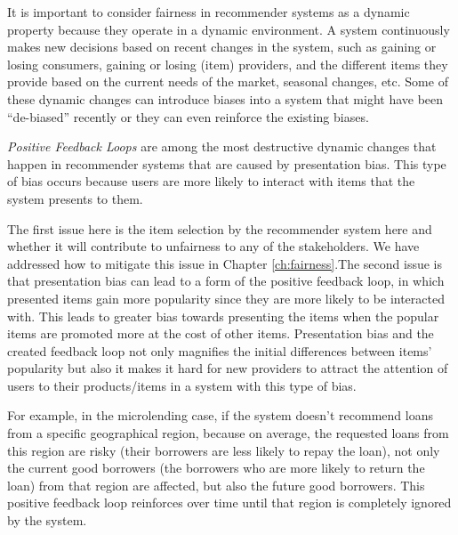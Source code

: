         It is important to consider fairness in recommender systems as a dynamic property because they operate in a dynamic environment. A system continuously makes new decisions based on recent changes in the system, such as gaining or losing consumers, gaining or losing (item) providers, and the different items they provide based on the current needs of the market, seasonal changes, etc. Some of these dynamic changes can introduce biases into a system that might have been ``de-biased'' recently or they can even reinforce the existing biases. 
        
        \textit{Positive Feedback Loops} are among the most destructive dynamic changes that happen in recommender systems \cite{o2016weapons} that are caused by presentation bias. This type of bias occurs because users are more likely to interact with items that the system presents to them. 
        
        The first issue here is the item selection by the recommender system here and whether it will contribute to unfairness to any of the stakeholders. We have addressed how to mitigate this issue in Chapter \ref{ch:fairness}.The second issue is that presentation bias can lead to a form of the positive feedback loop, in which presented items gain more popularity since they are more likely to be interacted with. This leads to greater bias towards presenting the items when the popular items are promoted more at the cost of other items. Presentation bias and the created feedback loop not only magnifies the initial differences between items' popularity but also it makes it hard for new providers to attract the attention of users to their products/items in a system with this type of bias.
    
        For example, in the microlending case, if the system doesn't recommend loans from a specific geographical region, because on average, the requested loans from this region are risky (their borrowers are less likely to repay the loan), not only the current good borrowers (the borrowers who are more likely to return the loan) from that region are affected, but also the future good borrowers. This positive feedback loop reinforces over time until that region is completely ignored by the system.
        
